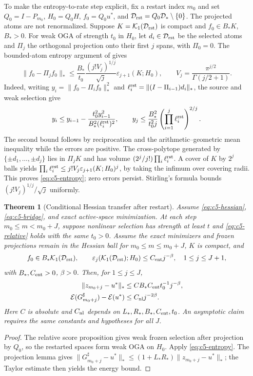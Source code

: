 \documentclass[11pt]{article}
\newtheorem{theorem}{Theorem}[section]
\theoremstyle{remark}\newtheorem{remark}[theorem]{Remark}
\begin{document}
To make the entropy-to-rate step explicit, fix a restart index $m_0$ and set
$Q_0=I-P_{m_0}$, $H_0=Q_0H$, $f_0=Q_0u^*$, and
$\mathcal D_{\rm rst}=Q_0\mathcal D_*\setminus\{0\}$.  The projected atoms are not renormalized.
Suppose $K=\mathcal K_1(\mathcal D_{\rm rst})$ is compact and $f_0\in B_*K$, $B_*>0$.
For weak OGA of strength $t_0$ in $H_0$, let $d_i\in\mathcal D_{\rm rst}$ be
the selected atoms and $\Pi_j$ the orthogonal projection onto their first $j$
spans, with $\Pi_0=0$. The bounded-atom entropy argument of
\cite[Theorem~4.2]{LiSiegelEntropy2024} gives
\begin{equation}
 \|f_0-\Pi_jf_0\|_*
 \leq \frac{B_*}{t_0}\frac{(j!V_j)^{1/j}}{\sqrt j}
 \varepsilon_{j+1}(K;H_0),
 \qquad V_j=\frac{\pi^{j/2}}{\Gamma(j/2+1)}.
 \label{eq:c5-entropy}
\end{equation}
Indeed, writing $y_i=\|f_0-\Pi_if_0\|_*^2$ and
$\ell_i^{\rm rst}=\|(I-\Pi_{i-1})d_i\|_*$, the source and weak selection give
\[
 y_i\le y_{i-1}-\frac{t_0^2y_{i-1}^2}{B_*^2(\ell_i^{\rm rst})^2},
 \qquad
 y_j\le\frac{B_*^2}{t_0^2j}
       \left(\prod_{i=1}^j\ell_i^{\rm rst}\right)^{2/j}.
\]
The second bound follows by reciprocation and the arithmetic--geometric mean
inequality while the errors are positive. The cross-polytope generated by
$\{\pm d_1,\ldots,\pm d_j\}$ lies in $\Pi_jK$ and has volume
$(2^j/j!)\prod_i\ell_i^{\rm rst}$.
A cover of $K$ by $2^j$ balls yields
$\prod_i\ell_i^{\rm rst}\le j!V_j\varepsilon_{j+1}(K;H_0)^j$,
by taking the infimum over covering radii. This proves \eqref{eq:c5-entropy};
zero errors persist. Stirling's formula bounds $(j!V_j)^{1/j}/\sqrt j$
uniformly.

\begin{theorem}[Conditional Hessian transfer after restart]
\label{thm:c5-hessian}
Assume \eqref{eq:c5-hessian}, \eqref{eq:c5-bridge}, and exact active-space
minimization. At each step $m_0\le m<m_0+J$, suppose nonlinear selection has
strength at least $t$ and \eqref{eq:c5-relative} holds with the same $t_0>0$.
Assume the exact minimizers and frozen projections remain in the Hessian ball
for $m_0\le m\le m_0+J$, $K$ is compact, and
\[
 f_0\in B_*\mathcal K_1(\mathcal D_{\rm rst}),\qquad
 \varepsilon_j(\mathcal K_1(\mathcal D_{\rm rst});H_0)\le C_{\rm ent}j^{-\beta},
 \quad 1\le j\le J+1,
\]
with $B_*,C_{\rm ent}>0$, $\beta>0$. Then, for $1\le j\le J$,
\begin{align}
 \|z_{m_0+j}-u^*\|_*&\le C B_*C_{\rm ent}t_0^{-1}j^{-\beta},\\
 \mathcal E(G_{m_0+j}^\sharp)-\mathcal E(u^*)&\le C_{\rm nl}j^{-2\beta}.
 \label{eq:c5-hessian-rate}
\end{align}
Here $C$ is absolute and $C_{\rm nl}$ depends on
$L_*,R_*,B_*,C_{\rm ent},t_0$. An asymptotic claim requires the same
constants and hypotheses for all $J$.
\end{theorem}
\begin{proof}
The relative score proposition gives weak frozen selection after projection by
$Q_0$, so the restarted spaces form weak OGA on $H_0$.  Apply
\eqref{eq:c5-entropy}.  The projection lemma gives
$\|G_{m_0+j}^\sharp-u^*\|_*\le(1+L_*R_*)\|z_{m_0+j}-u^*\|_*$;
the Taylor estimate then yields the energy bound.
\end{proof}
\end{document}
